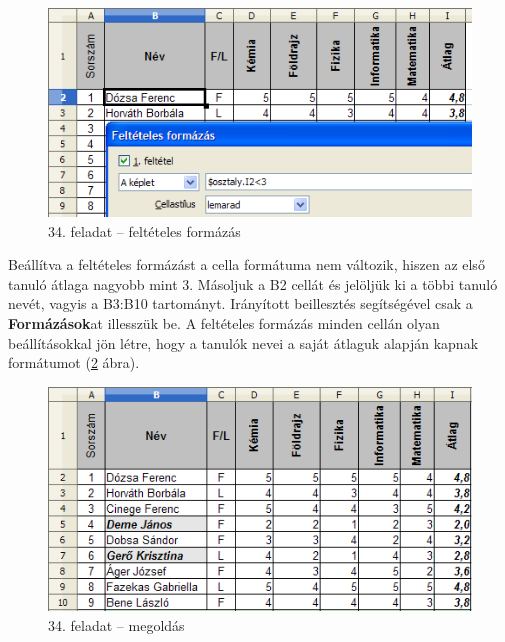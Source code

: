 \begin{figure}[!h]
\begin{center}
\includegraphics[width=13.042cm]{oocalcv2-img162.png}
\caption{34. feladat --  feltételes formázás}\label{34-feladatFeltételes}
\end{center}
\end{figure}

Beállítva a feltételes formázást a cella formátuma nem
változik, hiszen az első tanuló átlaga nagyobb mint 3.
Másoljuk a B2 cellát és jelöljük ki a többi tanuló
nevét, vagyis a B3:B10 tartományt. Irányított beillesztés
segítségével csak a \textbf{Formázások}at illesszük be. A
feltételes formázás minden cellán olyan beállításokkal
jön létre, hogy a tanulók nevei a saját átlaguk alapján
kapnak formátumot (\ref{34-feladatMegoldás} ábra).

\begin{figure}[!h]
\begin{center}
\includegraphics[width=12.883cm]{oocalcv2-img163.png}
\caption{34. feladat --  megoldás}\label{34-feladatMegoldás}
\end{center}
\end{figure}

